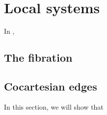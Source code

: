 \documentclass[main.tex]{subfiles}
\begin{document}
\section{Local systems}
\label{sec:local_systems}

In \cite{garcia2020enhanced},

\subsection{The fibration}
\label{ssc:the_fibration}

\subsection{Cocartesian edges}
\label{ssc:cocartesian_edges}

In this section, we will show that 
\end{document}
